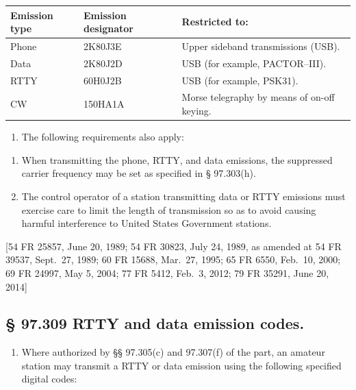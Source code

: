 \documentclass[
  letterpaper,
  DIV=11,
  numbers=noendperiod]{scrreport}
\providecommand{\tightlist}{%
  \setlength{\itemsep}{0pt}\setlength{\parskip}{0pt}}\usepackage{longtable,booktabs,array}
\begin{document}
\begin{longtable}[]{@{}lll@{}}
\toprule\noalign{}
Emission type & Emission designator & Restricted to: \\
\midrule\noalign{}
\endhead
\bottomrule\noalign{}
\endlastfoot
Phone & 2K80J3E & Upper sideband transmissions (USB). \\
Data & 2K80J2D & USB (for example, PACTOR--III). \\
RTTY & 60H0J2B & USB (for example, PSK31). \\
CW & 150HA1A & Morse telegraphy by means of on-off keying. \\
\end{longtable}

\begin{enumerate}
\def\labelenumi{(\roman{enumi})}
\setcounter{enumi}{1}
\tightlist
\item
  The following requirements also apply:
\end{enumerate}

\begin{enumerate}
\def\labelenumi{(\Alph{enumi})}
\item
  When transmitting the phone, RTTY, and data emissions, the suppressed
  carrier frequency may be set as specified in § 97.303(h).
\item
  The control operator of a station transmitting data or RTTY emissions
  must exercise care to limit the length of transmission so as to avoid
  causing harmful interference to United States Government stations.
\end{enumerate}

{[}54 FR 25857, June 20, 1989; 54 FR 30823, July 24, 1989, as amended at
54 FR 39537, Sept.~27, 1989; 60 FR 15688, Mar.~27, 1995; 65 FR 6550,
Feb.~10, 2000; 69 FR 24997, May 5, 2004; 77 FR 5412, Feb.~3, 2012; 79 FR
35291, June 20, 2014{]}

\hypertarget{rtty-and-data-emission-codes.}{%
\subsection*{§ 97.309 RTTY and data emission
codes.}\label{rtty-and-data-emission-codes.}}

\begin{enumerate}
\def\labelenumi{(\alph{enumi})}
\tightlist
\item
  Where authorized by §§ 97.305(c) and 97.307(f) of the part, an amateur
  station may transmit a RTTY or data emission using the following
  specified digital codes:
\end{enumerate}
\end{document}
